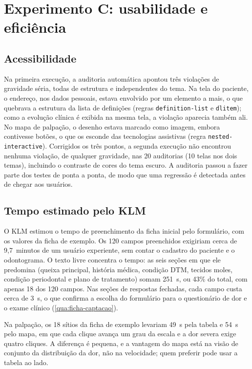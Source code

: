 \section{Experimento C: usabilidade e eficiência}

\subsection{Acessibilidade}

Na primeira execução, a auditoria automática apontou três violações de gravidade séria, todas de estrutura e independentes do tema. Na tela do paciente, o endereço, nos dados pessoais, estava envolvido por um elemento a mais, o que quebrava a estrutura da lista de definições (regras \texttt{definition-list} e \texttt{dlitem}); como a evolução clínica é exibida na mesma tela, a violação aparecia também ali. No mapa de palpação, o desenho estava marcado como imagem, embora contivesse botões, o que os esconde das tecnologias assistivas (regra \texttt{nested-interactive}). Corrigidos os três pontos, a segunda execução não encontrou nenhuma violação, de qualquer gravidade, nas 20 auditorias (10 telas nos dois temas), incluindo o contraste de cores do tema escuro. A auditoria passou a fazer parte dos testes de ponta a ponta, de modo que uma regressão é detectada antes de chegar aos usuários.

\subsection{Tempo estimado pelo KLM}

O KLM estimou o tempo de preenchimento da ficha inicial pelo formulário, com os valores da ficha de exemplo. Os 120 campos preenchidos exigiriam cerca de 9,7~minutos de um usuário experiente, sem contar o cadastro do paciente e o odontograma. O texto livre concentra o tempo: as seis seções em que ele predomina (queixa principal, história médica, condição DTM, tecidos moles, condição periodontal e plano de tratamento) somam 251~s, ou 43\% do total, com apenas 18 dos 120 campos. Nas seções de respostas fechadas, cada campo custa cerca de 3~s, o que confirma a escolha do formulário para o questionário de dor e o exame clínico (\autoref{qua:ficha-captacao}).

Na palpação, os 18 sítios da ficha de exemplo levariam 49~s pela tabela e 54~s pelo mapa, em que cada clique avança um grau da escala e a dor severa exige quatro cliques. A diferença é pequena, e a vantagem do mapa está na visão de conjunto da distribuição da dor, não na velocidade; quem preferir pode usar a tabela ao lado.

